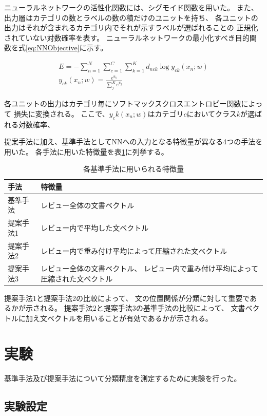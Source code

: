 \documentclass[twocolumn,a4paper]{ltjarticle}
\begin{document}
ニューラルネットワークの活性化関数には、シグモイド関数を用いた。
また、出力層はカテゴリの数とラベルの数の積だけのユニットを持ち、
各ユニットの出力はそれが含まれるカテゴリ内でそれが示すラベルが選ばれることの
正規化されていない対数確率を表す。
ニューラルネットワークの最小化すべき目的関数を式\ref{eq:NNObjective}に示す。

\begin{gather}
  E = - \sum^{N}_{n = 1} \sum^{C}_{c = 1} \sum^{K}_{k = 1}
        d_{nck} \log{y_{ck}(x_n; w)}
  \label{eq:NNObjective} \\
  y_{ck}(x_n; w) = \frac{e^{u_k}}{\sum^{K}_{j} e^{u_j}}
\end{gather}

各ユニットの出力はカテゴリ毎にソフトマックスクロスエントロピー関数によって
損失に変換される。
ここで、$y_ck(x_n; w)$はカテゴリ$c$においてクラス$k$が選ばれる対数確率、




提案手法に加え、基準手法としてNNへの入力となる特徴量が異なる4つの手法を用いた。
各手法に用いた特徴量を表\ref{tab:MethodFeatures}に列挙する。

\begin{table}
  \caption{各基準手法に用いられる特徴量}
  \begin{tabular}{l | l}\label{tab:MethodFeatures}
    手法 & 特徴量 \\
    \hline
    基準手法  & レビュー全体の文書ベクトル \\
    提案手法1 & レビュー内で平均した文ベクトル \\
    提案手法2 & レビュー内で重み付け平均によって圧縮された文ベクトル \\
    提案手法3 & レビュー全体の文書ベクトル、
        レビュー内で重み付け平均によって圧縮された文ベクトル \\
  \end{tabular}
\end{table}

提案手法1と提案手法2の比較によって、
文の位置関係が分類に対して重要であるかが示される。
提案手法2と提案手法3の基準手法の比較によって、
文書ベクトルに加え文ベクトルを用いることが有効であるかが示される。


\section{実験}

基準手法及び提案手法について分類精度を測定するために実験を行った。


\subsection{実験設定}
\end{document}
